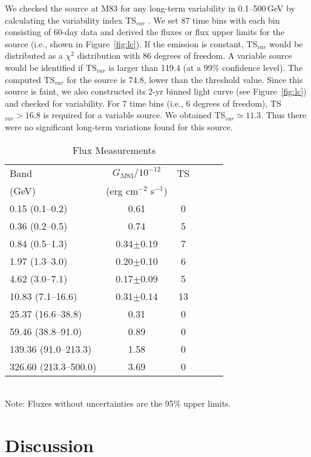 \documentclass[twocolumn]{aastex631}
\begin{document}
We checked the source at M83 for any long-term variability 
in 0.1--500\,GeV by calculating the variability 
index TS$_{var}$ \citep{nol+12}. We set 87 time bins with each
bin consisting of 60-day data and derived the fluxes or flux upper limits
for the source (i.e., shown in Figure~\ref{fig:lc}).
If the emission is constant, 
TS$_{var}$ would be distributed as a $\chi^{2}$ distribution with 86 degrees 
of freedom. 
A variable source would be identified if TS$_{var}$ is larger than 119.4 
(at a 99\% confidence level).
The computed TS$_{var}$ for the source is 74.8, lower than the 
threshold value. Since this source is faint, we also
constructed its 2-yr binned light curve (see Figure~\ref{fig:lc}) and checked 
for variability. For 7 time bins (i.e., 6 degrees of freedom), 
TS$_{var}>16.8$ is required for a variable source. We obtained 
TS$_{var}\simeq 11.3$. Thus there were no significant long-term variations
found for this source.
\begin{table}
\begin{center}
\caption{Flux Measurements}
\label{tab:spectra}
\begin{tabular}{lccccc}
\hline
Band & $G_{M83}/10^{-12}$ & TS \\
	(GeV) & (erg cm$^{-2}$ s$^{-1}$) & \\\hline
0.15 (0.1--0.2) & 0.61 & 0 \\
0.36 (0.2--0.5) & 0.74 & 5 \\
0.84 (0.5--1.3) & 0.34$\pm$0.19 & 7 \\
1.97 (1.3--3.0) & 0.20$\pm$0.10 & 6 \\
4.62 (3.0--7.1) & 0.17$\pm$0.09 & 5 \\
10.83 (7.1--16.6) & 0.31$\pm$0.14 & 13 \\
25.37 (16.6--38.8) & 0.31 & 0 \\
59.46 (38.8--91.0) & 0.89 & 0 \\
139.36 (91.0--213.3) & 1.58 & 0 \\
326.60 (213.3--500.0) & 3.69 & 0 \\
\hline
\end{tabular}
\\
\footnotesize{Note: Fluxes without uncertainties are the 95$\%$ upper limits.}
\end{center}
\end{table}

\section{Discussion}
\label{sec:dis}
\end{document}
